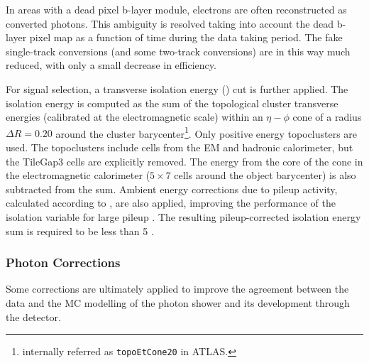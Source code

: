 In areas with a dead pixel b-layer module, electrons are often reconstructed as converted photons.
This ambiguity is resolved taking into account the dead b-layer pixel map as a function of time
during the data taking period. The fake single-track conversions (and some two-track conversions)
are in this way much reduced, with only a small decrease in efficiency. %

For signal selection, a transverse isolation energy (\etiso) cut is further applied.
The isolation energy is computed as the sum of the topological cluster transverse energies
(calibrated at the electromagnetic scale) within an $\eta-\phi$ cone of a radius $\Delta R = 0.20$
around the cluster barycenter\footnote{internally referred as \texttt{topoEtCone20} in ATLAS.}.
Only positive energy topoclusters are used. The topoclusters include cells from the EM and
hadronic calorimeter, but the TileGap3 cells are explicitly removed.
The energy from the core of the cone in the electromagnetic calorimeter ($5\times7$ cells around the object
barycenter) is also subtracted from the sum. Ambient energy corrections due to pileup activity, calculated
according to \cite{Hance:1379530}, are also applied, improving the performance of the isolation variable
for large pileup \cite{Laplace:1444890}. The resulting pileup-corrected isolation energy sum is required to be less than 5 \gev.

\subsubsection{Photon Corrections}

Some corrections are ultimately applied to improve the agreement between the data and the
MC modelling of the photon shower and its development through the detector.

